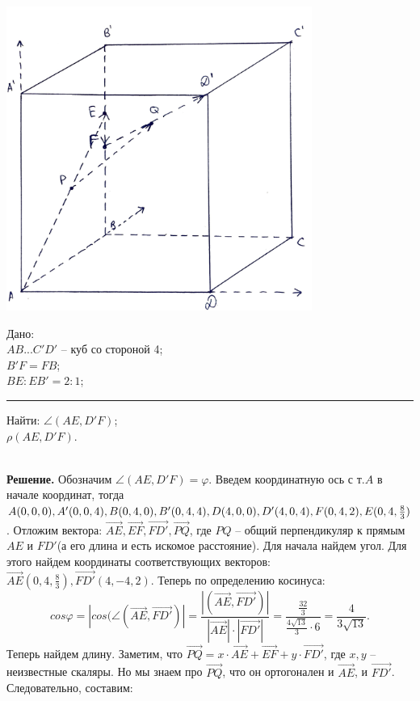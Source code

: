\documentclass[a4paper, 12pt]{article}
\begin{document}
\begin{spacing}{1}
\begin{minipage}[c]{50mm}
	\includegraphics[width=100mm]{picture.pdf}
\end{minipage} \hfill
\begin{minipage}[b]{60mm}
	Дано: \\
	$AB...C'D'$ -- куб со стороной 4;\\
	$B'F=FB$;\\
	$BE:EB'=2:1$;
	\medskip\hrule\medskip
	Найти:
	$\angle(AE,D'F)$;\\
	$\rho(AE, D'F)$.
\end{minipage}\\
\noindent \textbf{Решение.} Обозначим $\angle(AE,D'F) = \varphi$. Введем координатную ось с т.$A$ в начале координат, тогда $A(0, 0, 0), A'(0, 0, 4), B(0,4,0),\\
B'(0, 4, 4), D(4,0,0), D'(4,0,4), F(0, 4, 2), E(0, 4, \frac{8}{3})$. Отложим вектора: $\overrightarrow{AE}, \overrightarrow{EF}, \overrightarrow{FD'}, \overrightarrow{PQ}$, где $PQ$ -- общий перпендикуляр к прямым $AE$ и $FD'$(а его длина и есть искомое расстояние). Для начала найдем угол.  Для этого найдем координаты соответствующих векторов: $\overrightarrow{AE}(0, 4, \frac{8}{3}), \overrightarrow{FD'}(4, -4, 2)$. Теперь по определению косинуса:
$$
cos\varphi = |cos(\angle(\overrightarrow{AE}, \overrightarrow{FD'})| = \frac{|(\overrightarrow{AE},\overrightarrow{FD'})|}{|\overrightarrow{AE}|\cdot |\overrightarrow{FD'}|} = \frac{\frac{32}{3}}{\frac{4\sqrt{13}}{3}\cdot 6} = \frac{4}{3\sqrt{13}}.
$$
Теперь найдем длину. Заметим, что $\overrightarrow{PQ} = x\cdot \overrightarrow{AE} + \overrightarrow{EF} + y \cdot \overrightarrow{FD'}$, где $x, y$ -- неизвестные скаляры. Но мы знаем про $\overrightarrow{PQ}$, что он ортогонален и $\overrightarrow{AE}$, и $\overrightarrow{FD'}$. Следовательно, составим:

\end{spacing}
\end{document}
